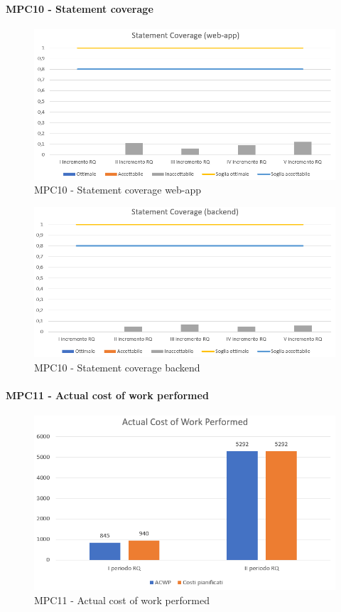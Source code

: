   \clearpage
  \paragraph{MPC10 - Statement coverage}
  \begin{figure}[h!]
    \centering
      \includegraphics[scale=0.85]{Immagini/StatCov WA.PNG}
    \caption{MPC10 - Statement coverage web-app}
  \end{figure}

  \begin{figure}[h!]
    \centering
      \includegraphics[scale=0.9]{Immagini/StatCov BE.PNG}
    \caption{MPC10 - Statement coverage backend}
  \end{figure}



  \clearpage
  \paragraph{MPC11 - Actual cost of work performed}
  \begin{figure}[h!]
    \centering
      \includegraphics[scale=1]{Immagini/ACWP.PNG}
    \caption{MPC11 -  Actual cost of work performed}
  \end{figure}



